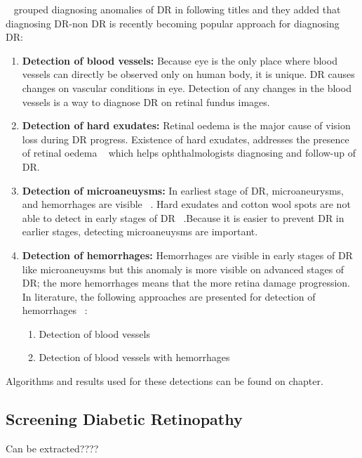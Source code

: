 ~\cite{rocha2011points} grouped diagnosing anomalies of DR in following titles and they added that diagnosing DR-non DR is recently becoming popular approach for diagnosing DR:  
\begin{enumerate}
    \item \textbf{Detection of blood vessels:}  Because eye is the only place where blood vessels can directly be observed only on human body, it is unique. DR causes changes on vascular conditions in eye. Detection of any changes in the blood vessels is a way to diagnose DR on retinal fundus images. ~\cite{mendonca2006segmentation}
    \item \textbf{Detection of hard exudates:} Retinal oedema is the major cause of vision loss during DR progress. Existence of hard exudates, addresses the presence of retinal oedema ~\cite{singer1992screening} which helps ophthalmologists diagnosing and follow-up of DR. ~\cite{garcia2009neural} 
    \item \textbf{Detection of microaneuysms:} In earliest stage of DR, microaneurysms, and hemorrhages are visible ~\cite{doi:10.1056/NEJMra021678}. Hard exudates and cotton wool spots are not able to detect in early stages of DR ~\cite{navarro2016automatic}.Because it is easier to prevent DR in earlier stages, detecting microaneuysms are important.
    \item \textbf{Detection of hemorrhages:} Hemorrhages are visible in early stages of DR like microaneuysms but this anomaly is more visible on advanced stages of DR; the more hemorrhages means that the more retina damage progression. In literature, the following approaches are presented for detection of hemorrhages ~\cite{rocha2011points}: 
    \begin{enumerate}
        \item Detection of blood vessels
        \item Detection of blood vessels with hemorrhages
    \end{enumerate}
\end{enumerate}

Algorithms and results used for these detections can be found on   chapter.




\subsection{Screening Diabetic Retinopathy}

Can be extracted???? 


